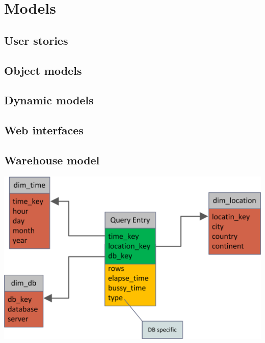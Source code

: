 \section{Models}

\subsection{User stories}

\subsection{Object models}

\subsection{Dynamic models}

\subsection{Web interfaces}

\subsection{Warehouse model}
\begin{center}
\includegraphics[width=1\linewidth]{Pictures/WareHouseDiagramm.png}
\end{center}  